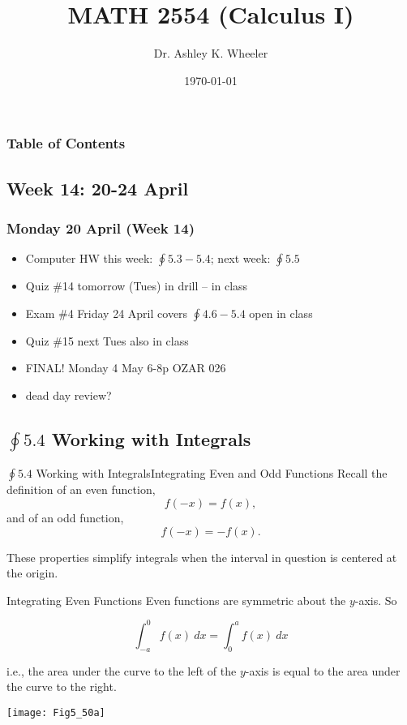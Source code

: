 \documentclass[14pt]{beamer}
\title[Cal I S2015]{MATH 2554 (Calculus I)}
\subtitle{}
\author[Wheeler]{Dr. Ashley K. Wheeler}
\institute{University of Arkansas}
\date{\today}
\newcommand{\dint}{\displaystyle\int}
\begin{document}
\maketitle

\begin{frame}
\frametitle{Table of Contents}
\tableofcontents
\end{frame}


\begin{frame}
\section[Week 14]{Week 14: 20-24 April}
\frametitle{Monday 20 April (Week 14)}
\small
\begin{itemize}
\item Computer HW this week: $\oint 5.3-5.4$; next week: $\oint 5.5$
\item Quiz \#14 tomorrow (Tues) in drill -- in class
\item Exam \#4 Friday 24 April covers $\oint 4.6-5.4$ open in class
\item Quiz \#15 next Tues also in class
\item FINAL! Monday 4 May 6-8p OZAR 026
\item dead day review?
\end{itemize}
\end{frame}

\subsection[$\oint 5.4$ Working with Integrals]{$\oint 5.4$ Working with Integrals}

\begin{frame}{$\oint 5.4$ Working with Integrals}{Integrating Even and Odd Functions}
\small
Recall the definition of an even function,
\[f(-x)=f(x),\] 
and of an odd function, 
\[f(-x)=-f(x).\]

These properties simplify integrals when the interval in question is centered at the origin.
\end{frame}

\begin{frame}{\small Integrating Even Functions}
\footnotesize
Even functions are symmetric about the $y$-axis.  So 

\vspace{-0.5pc}
\[\int_{-a}^0 f(x)\ dx = \int_0^a f(x)\ dx\]

\vspace{-0.4pc}
i.e., the area under the curve to the left of the $y$-axis is equal to the area under the curve to the right.

\vspace{-1.1pc}
\begin{center}
\texttt{[image: Fig5\_50a]}
\end{center}

\end{frame}
\end{document}
